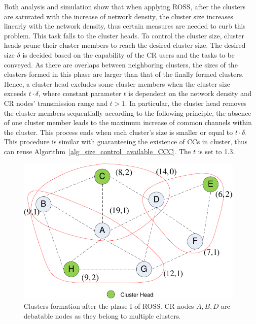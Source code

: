 \documentclass[10pt,journal,compsoc]{IEEEtran}
\theoremstyle{mytheoremstyle}
\theoremstyle{mytheoremstyle}
\theoremstyle{mytheoremstyle}
\begin{document}
Both analysis and simulation show that when applying ROSS, after the clusters are saturated with the increase of network density, the cluster size increases linearly with the network density, thus certain measures are needed to curb this problem.
This task falls to the cluster heads.
To control the cluster size, cluster heads prune their cluster members to reach the desired cluster size.
The desired size $\delta$ is decided based on the capability of the CR users and the tasks to be conveyed.
As there are overlaps between neighboring clusters, the sizes of the clusters formed in this phase are larger than that of the finally formed clusters.
Hence, a cluster head excludes some cluster members when the cluster size exceeds $t\cdot \delta$, where constant parameter $t$ is dependent on the network density and CR nodes' transmission range and $t>1$.
In particular, the cluster head removes the cluster members sequentially according to the following principle, the absence of one cluster member leads to the maximum increase of common channels within the cluster.
This process ends when each cluster's size is smaller or equal to $t \cdot\delta$.
This procedure is similar with guaranteeing the existence of CCs in cluster, thus can reuse Algorithm~\ref{alg_size_control_available_CCC}.
The $t$ is set to 1.3. 	


\begin{figure}[ht!]
  \centering
  \includegraphics[width=0.5\linewidth]{figure2.pdf}
  \caption{Clusters formation after the phase I of ROSS. CR nodes $A, B, D$ are debatable nodes as they belong to multiple clusters.}
  \label{fig2}
\end{figure}
\end{document}
